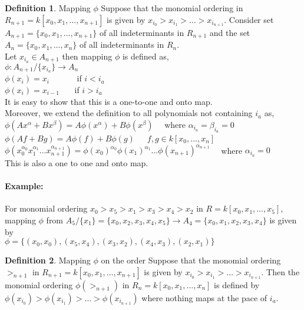 \documentclass[12pt,a4paper]{article}
\theoremstyle{definition}
\newtheorem{definition}{Definition}
\begin{document}
\begin{definition}{Mapping $\phi$}
Suppose that the monomial ordering in $R_{n+1}=k[x_0,x_1,\ldots ,x_{n+1}]$ is given by $x_{i_{0}}>x_{i_{1}}> \ldots >x_{i_{n+1}}$. Consider set $A_{n+1}=\{x_0, x_1, \ldots ,x_{n+1}\}$ of all indeterminants in $R_{n+1}$  and the set $A_{n}=\{x_0, x_1, \ldots ,x_n \}$ of all indeterminants in $R_{n}$.\\
Let $x_{i_{a}} \in A_{n+1}$
then mapping $\phi$ is defined as,\\
$\phi:A_{n+1}/ \{x_{i_{a}}\} \rightarrow A_{n}$\\
$\phi (x_{i})=x_{i}$ \ \ \ \ \ \ if $i<i_{a}$\\
$\phi(x_{i})=x_{i-1}$ \ \ \ if $i>i_{a}$\\
It is easy to show that this is a one-to-one and onto map.\\
Moreover, we extend the definition to all polynomials not containing $i_{a}$ as,\\
$\phi(Ax^\alpha + Bx^\beta)=A\phi(x^\alpha)+B\phi(x^\beta)$ \ \ where $\alpha_{i_a}=\beta_{i_a}=0$\\
$\phi (Af+Bg)= A\phi(f)+B\phi(g)$\ \ \ $f,g \in k[x_0, \ldots , x_n]$\\
$\phi(x_{0}^{\alpha_{0}}x_1^{\alpha_{1}} \ldots x_{n+1}^{\alpha_{n+1}})=\phi(x_0)^{\alpha_0}\phi(x_1)^{\alpha_1} \ldots \phi(x_{n+1})^{\alpha_{n+1}}$ \ \ where $\alpha_{i_a}=0$\\
This is also a one to one and onto map.
\end{definition}

\paragraph*{Example:}
For monomial ordering $x_0>x_5>x_1>x_3>x_4>x_2$ in $R=k[x_0, x_1, \ldots , x_5]$, mapping $\phi$ from $A_{5}/\{x_1\}=\{x_0, x_2, x_3, x_4, x_5\} \rightarrow A_{4}=\{x_0, x_1, x_2, x_3, x_4\}$ is given by \\
$\phi = \{(x_0, x_0), (x_5, x_4), (x_3, x_2), (x_4, x_3), (x_2, x_1)\}$

\begin{definition}{Mapping $\phi$ on the order}
Suppose that the monomial ordering $>_{n+1}$ in $R_{n+1}=k[x_0,x_1,\ldots ,x_{n+1}]$ is given by $x_{i_{0}}>x_{i_{1}}> \ldots >x_{i_{n+1}}$. Then the monomial ordering $\phi(>_{n+1})$ in $R_{n}=k[x_0,x_1,\ldots ,x_{n}]$ is defined by $\phi(x_{i_{0}})>\phi(x_{i_{1}})> \ldots >\phi(x_{i_{n+1}})$ where nothing maps at the pace of $i_{a}$.  

\end{definition}
\end{document}
